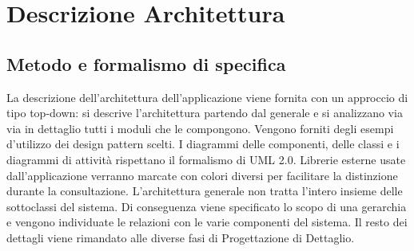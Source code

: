 %


\section{Descrizione Architettura} %
\label{sec:descrizione_architettura}

\subsection{Metodo e formalismo di specifica}
La descrizione dell'architettura dell'applicazione viene fornita con un approccio di tipo top-down: si descrive l'architettura partendo dal generale e si analizzano via via in dettaglio tutti i moduli che le compongono. Vengono forniti degli esempi d'utilizzo dei design pattern scelti. I diagrammi delle componenti, delle classi e i diagrammi di attività rispettano il formalismo di UML 2.0. \newline
Librerie esterne usate dall'applicazione verranno marcate con colori diversi per facilitare la distinzione durante la consultazione. \newline
L’architettura generale non tratta l’intero insieme delle sottoclassi del sistema. Di conseguenza viene specificato lo scopo di una gerarchia e vengono individuate le relazioni con le varie componenti del sistema. Il resto dei dettagli viene rimandato alle diverse fasi di Progettazione di Dettaglio.


